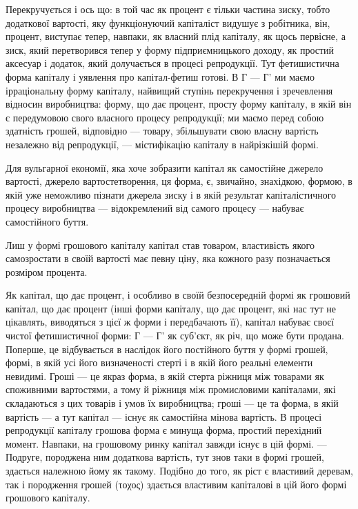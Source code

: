 Перекручується і ось що: в той час як процент є тільки
частина зиску, тобто додаткової вартості, яку функціонуючий
капіталіст видушує з робітника, він, процент, виступає тепер,
навпаки, як власний плід капіталу, як щось первісне, а зиск,
який перетворився тепер у форму підприємницького доходу,
як простий аксесуар і додаток, який долучається в процесі репродукції.
Тут фетишистична форма капіталу і уявлення про
капітал-фетиш готові. В Г — Г' ми маємо ірраціональну форму
капіталу, найвищий ступінь перекручення і зречевлення відносин
виробництва: форму, що дає процент, просту форму капіталу,
в якій він є передумовою свого власного процесу репродукції;
ми маємо перед собою здатність грошей, відповідно —
товару, збільшувати свою власну вартість незалежно від репродукції,
— містифікацію капіталу в найрізкішій формі.

Для вульгарної економії, яка хоче зобразити капітал як самостійне
джерело вартості, джерело вартостетворення, ця форма,
є, звичайно, знахідкою, формою, в якій уже неможливо пізнати
джерела зиску і в якій результат капіталістичного процесу
виробництва — відокремлений від самого процесу — набуває самостійного
буття.

Лиш у формі грошового капіталу капітал став товаром,
властивість якого самозростати в своїй вартості має певну ціну,
яка кожного разу позначається розміром процента.

Як капітал, що дає процент, і особливо в своїй безпосередній
формі як грошовий капітал, що дає процент (інші форми капіталу,
що дає процент, які нас тут не цікавлять, виводяться
з цієї ж форми і передбачають її), капітал набуває своєї чистої
фетишистичної форми: Г — Г' як суб’єкт, як річ, що може бути
продана. Поперше, це відбувається в наслідок його постійного
буття у формі грошей, формі, в якій усі його визначеності стерті
і в якій його реальні елементи невидимі. Гроші — це якраз форма,
в якій стерта ріжниця між товарами як споживними вартостями,
а тому й ріжниця між промисловими капіталами, які складаються з
цих товарів і умов їх виробництва; гроші — це та форма, в якій
вартість — а тут капітал — існує як самостійна мінова вартість.
В процесі репродукції капіталу грошова форма є минуща форма,
простий перехідний момент. Навпаки, на грошовому ринку капітал
завжди існує в цій формі. — Подруге, породжена ним додаткова
вартість, тут знов таки в формі грошей, здається належною
йому як такому. Подібно до того, як ріст є властивий
деревам, так і породження грошей (τοχος) здається властивим
капіталові в цій його формі грошового капіталу.

